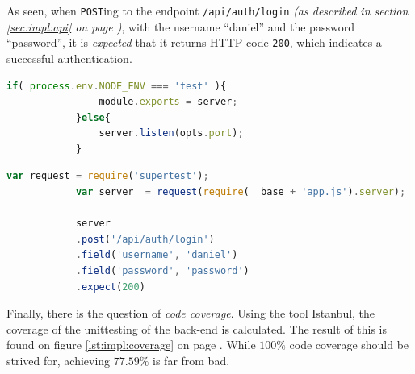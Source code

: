		As seen, when \verb=POST=ing to the endpoint \verb=/api/auth/login= \emph{(as described in section \ref{sec:impl:api} on page \pageref{sec:impl:api})}, with the username ``daniel'' and the password ``password'', it is \emph{expected} that it returns HTTP code \verb=200=, which indicates a successful authentication.


		\begin{lstlisting}[language=Javascript,gobble=12,caption={Application's export of primary variable, when in test environment},label={lst:impl:backend:testexport}]
            if( process.env.NODE_ENV === 'test' ){
                module.exports = server;
            }else{
                server.listen(opts.port);
            }
        \end{lstlisting}

		\begin{lstlisting}[language=Javascript,gobble=12,caption={Unittesting API endpoints using Supertest},label={lst:impl:backend:supertest}]
            var request = require('supertest');  
            var server  = request(require(__base + 'app.js').server);
            
            server
            .post('/api/auth/login')
            .field('username', 'daniel')
            .field('password', 'password')
            .expect(200)
		\end{lstlisting}

		Finally, there is the question of \emph{code coverage}. Using the tool Istanbul, the coverage of the unittesting of the back-end is calculated. The result of this is found on figure \ref{lst:impl:coverage} on page \pageref{lst:impl:coverage}. While $100\%$ code coverage should be strived for, achieving $77.59\%$ is far from bad.

		

































